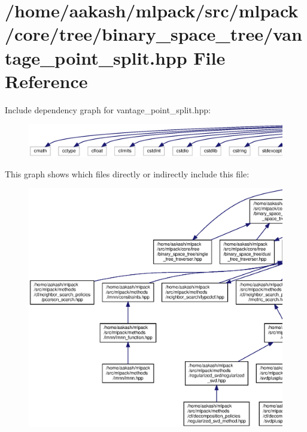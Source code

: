 \section{/home/aakash/mlpack/src/mlpack/core/tree/binary\+\_\+space\+\_\+tree/vantage\+\_\+point\+\_\+split.hpp File Reference}
\label{vantage__point__split_8hpp}
Include dependency graph for vantage\+\_\+point\+\_\+split.\+hpp\+:
\nopagebreak
\begin{figure}[H]
\begin{center}
\leavevmode
\includegraphics[width=350pt]{vantage__point__split_8hpp__incl}
\end{center}
\end{figure}
This graph shows which files directly or indirectly include this file\+:
\nopagebreak
\begin{figure}[H]
\begin{center}
\leavevmode
\includegraphics[width=350pt]{vantage__point__split_8hpp__dep__incl}
\end{center}
\end{figure}
